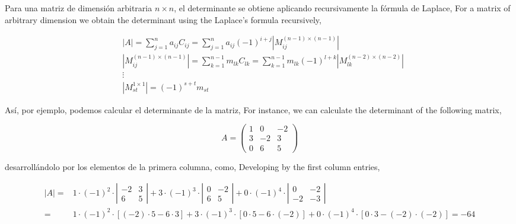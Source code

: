 \begin{paracol}{2}
Para una matriz de dimensión arbitraria $n\times n$, el determinante se obtiene aplicando recursivamente la fórmula de Laplace,
\switchcolumn
For a matrix of arbitrary dimension we obtain the determinant using the Laplace's formula recursively,
\end{paracol}

\begin{align*}
&\vert A  \vert = \sum_{j=1}^na_{ij}C_{ij} =\sum_{j=1}^na_{ij}(-1)^{i+j} \left \vert M_{ij}^{(n-1)\times(n-1)} \right \vert \\
&\left \vert M_{ij}^{(n-1)\times(n-1)} \right \vert = \sum_{k=1}^{n-1}m_{lk}C_{lk} =\sum_{k=1}^{n-1}m_{lk}(-1)^{l+k} \left \vert M_{lk}^{(n-2)\times (n-2)} \right \vert\\
&\vdots \\
&\left \vert M_{st}^{1\times 1}\right \vert=(-1)^{s+t}m_{st} 
\end{align*}
\begin{paracol}{2}
Así, por ejemplo, podemos calcular el determinante de la matriz,
\switchcolumn
For instance, we can calculate the determinant of the following matrix,
\end{paracol}
\begin{equation*}
A=\begin{pmatrix}
1& 0& -2\\
3& -2& 3\\
0& 6& 5
\end{pmatrix}
\end{equation*}
\begin{paracol}{2}
desarrollándolo por los elementos de la primera columna, como,
\switchcolumn
Developing by the first column entries,
\end{paracol}
\begin{align*}
\left\vert A \right\vert =& 1\cdot (-1)^2\cdot 
\left\vert \begin{matrix}
-2& 3\\ 
6& 5
\end{matrix} \right\vert + 3\cdot (-1)^3\cdot
\left\vert \begin{matrix}
0& -2\\ 
6& 5
\end{matrix} \right\vert+ 0\cdot (-1)^4 \cdot 
\left\vert \begin{matrix}
0& -2\\ 
-2& -3
\end{matrix} \right\vert \\
=& 1\cdot (-1)^2\cdot \left[ (-2)\cdot 5 - 6\cdot 3 \right] +3\cdot (-1)^3\cdot  \left[ 0\cdot 5 - 6\cdot (-2)\right] + 0\cdot (-1)^4 \cdot \left[ 0\cdot 3 - (-2)\cdot (-2)\right]= -64
\end{align*}

